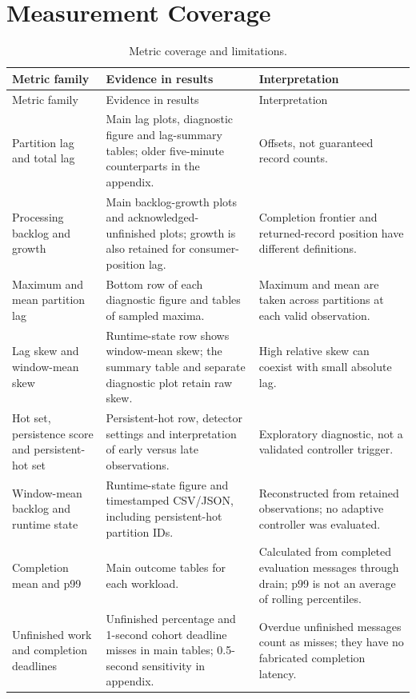 \clearpage
\section{Measurement Coverage}
\label{app:measurement-coverage}
\begingroup
\centering\footnotesize
\setlength{\tabcolsep}{3pt}
\renewcommand{\arraystretch}{1.06}
\begin{longtable}{@{}>{\raggedright\arraybackslash}p{.22\linewidth}>{\raggedright\arraybackslash}p{.42\linewidth}>{\raggedright\arraybackslash}p{.29\linewidth}@{}}
\caption{Metric coverage and limitations.}
\label{tab:result-metric-coverage}\\
\toprule
Metric family & Evidence in results & Interpretation\\
\midrule\endfirsthead
\toprule
Metric family & Evidence in results & Interpretation\\\midrule\endhead
Partition lag and total lag & Main lag plots, diagnostic figure and lag-summary tables; older five-minute counterparts in the appendix. & Offsets, not guaranteed record counts.\\
Processing backlog and growth & Main backlog-growth plots and acknowledged-unfinished plots; growth is also retained for consumer-position lag. & Completion frontier and returned-record position have different definitions.\\
Maximum and mean partition lag & Bottom row of each diagnostic figure and tables of sampled maxima. & Maximum and mean are taken across partitions at each valid observation.\\
Lag skew and window-mean skew & Runtime-state row shows window-mean skew; the summary table and separate diagnostic plot retain raw skew. & High relative skew can coexist with small absolute lag.\\
Hot set, persistence score and persistent-hot set & Persistent-hot row, detector settings and interpretation of early versus late observations. & Exploratory diagnostic, not a validated controller trigger.\\
Window-mean backlog and runtime state & Runtime-state figure and timestamped CSV/JSON, including persistent-hot partition IDs. & Reconstructed from retained observations; no adaptive controller was evaluated.\\
Completion mean and p99 & Main outcome tables for each workload. & Calculated from completed evaluation messages through drain; p99 is not an average of rolling percentiles.\\
Unfinished work and completion deadlines & Unfinished percentage and 1-second cohort deadline misses in main tables; 0.5-second sensitivity in appendix. & Overdue unfinished messages count as misses; they have no fabricated completion latency.\\

\end{longtable}
